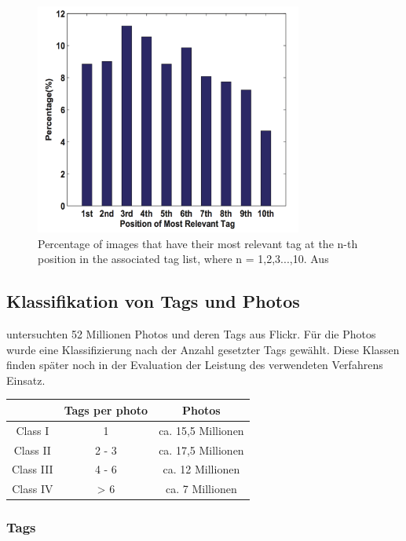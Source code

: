 \begin{itemize}
  
  \begin{figure}[htbp]
    \centering
      \includegraphics[height=3in]{images/tag_ranking_psotion_relevant_tag.png}
    \caption{Percentage of images that have their most relevant tag at the n-th position in the associated tag list, where n = 1,2,3...,10. Aus \cite{ranking}}
    \label{fig:images_tag_ranking_psotion_relevant_tag}
  \end{figure}
  
  
 \end{itemize}

\subsection{Klassifikation von Tags und Photos} %
\label{sub:klassifikation_von_tags}

\cite{collectiveKnowledge} untersuchten 52 Millionen Photos und deren Tags aus Flickr. Für die Photos wurde eine Klassifizierung nach der Anzahl gesetzter Tags gewählt. Diese Klassen finden später noch in der Evaluation der Leistung des verwendeten Verfahrens Einsatz.

\begin{tabular}{ccc}
\hline
 & Tags per photo & Photos\\
\hline
Class I & 1 & ca. 15,5 Millionen\\
\hline
Class II & 2 - 3 & ca. 17,5 Millionen\\
\hline
Class III & 4 - 6 & ca. 12 Millionen\\
\hline
Class IV & > 6 & ca. 7 Millionen\\
\hline
\end{tabular}

\subsubsection*{Tags} %
\label{ssub:tags}

